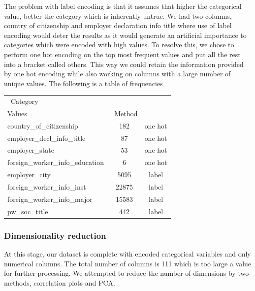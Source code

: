 \documentclass[conference]{IEEEtran}
\begin{document}
The problem with label encoding is that it assumes that higher the categorical value, better the category which is inherently untrue. We had two columns, country of citizenship and employer declaration info title where use of label encoding would deter the results as it would generate an artificial importance to categories which were encoded with high values. To resolve this, we chose to perform one hot encoding on the top most frequent values and put all the rest into a bracket called others. This way we could retain the information provided by one hot encoding while also working on columns with a large number of unique values. The following is a table of frequencies
\begin{center}
 \label{tab:title}
  \begin{tabularx}{0.451\textwidth}{| l | c | c|}
  \hline
  \centering
     \ Category & \ \begin{tabular}{@{}c@{}}Unique\\ Values\end{tabular} & \ Method\\ \hline
	country\_of\_citizenship & 182 & one hot \\
	employer\_decl\_info\_title & 87 & one hot \\
	employer\_state & 53 & one hot \\
	foreign\_worker\_info\_education & 6 & one hot \\
	employer\_city & 5095 & label \\
	foreign\_worker\_info\_inst & 22875 & label \\
	foreign\_worker\_info\_major & 15583 & label \\
	pw\_soc\_title & 442 & label \\
    \hline
  \end{tabularx}
  \end{center}
\subsubsection{\textbf{Dimensionality reduction} }
At this stage, our dataset is complete with encoded categorical variables and only numerical columns. The total number of columns is 111 which is too large a value for further processing. We attempted to reduce the number of dimensions by two methods, correlation plots and PCA.
\end{document}
